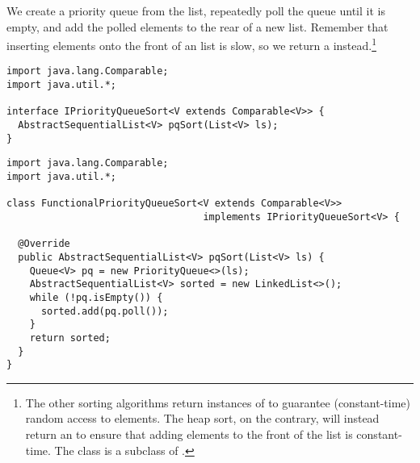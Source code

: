 We create a priority queue from the list, repeatedly poll the queue until it is empty, and add the polled elements to the rear of a new list. 
Remember that inserting elements onto the front of an  list is slow, so we return a  instead.\footnote{The other sorting algorithms return instances of  to guarantee (constant-time) random access to elements. 
The heap sort, on the contrary, will instead return an  to ensure that adding elements to the front of the list is constant-time. 
The  class is a subclass of .}

\begin{lstlisting}[language=MyJava]
import java.lang.Comparable;
import java.util.*;

interface IPriorityQueueSort<V extends Comparable<V>> {
  AbstractSequentialList<V> pqSort(List<V> ls);
}
\end{lstlisting}

\begin{lstlisting}[language=MyJava]
import java.lang.Comparable;
import java.util.*;

class FunctionalPriorityQueueSort<V extends Comparable<V>> 
                                  implements IPriorityQueueSort<V> {

  @Override
  public AbstractSequentialList<V> pqSort(List<V> ls) {
    Queue<V> pq = new PriorityQueue<>(ls);
    AbstractSequentialList<V> sorted = new LinkedList<>();
    while (!pq.isEmpty()) {
      sorted.add(pq.poll());
    }
    return sorted;
  }
}
\end{lstlisting}
